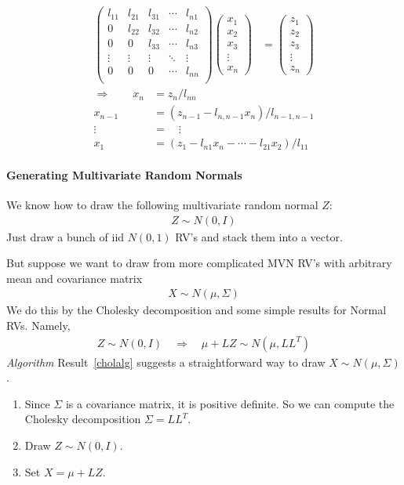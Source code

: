 \documentclass[12pt]{article}
\theoremstyle{plain}
\theoremstyle{definition}
\theoremstyle{remark}
\begin{document}
\begin{align*}
  \begin{pmatrix}
    l_{11} & l_{21}  & l_{31} & \cdots & l_{n1}  \\
    0 & l_{22} &  l_{32} & \cdots & l_{n2}\\
    0 & 0 & l_{33}& \cdots & l_{n3}\\
    \vdots & \vdots & \vdots & \ddots & \vdots\\
    0 & 0 & 0 &\cdots & l_{nn}\\
  \end{pmatrix}
  \begin{pmatrix}
    x_1 \\ x_2 \\ x_3 \\ \vdots \\ x_n
  \end{pmatrix}
  &=
  \begin{pmatrix}
    z_1 \\ z_2 \\ z_3 \\ \vdots \\ z_n
  \end{pmatrix}
\end{align*}
\begin{align*}
  \Rightarrow \qquad
  x_n &= z_n/l_{nn} \\
  x_{n-1} &= (z_{n-1} - l_{n,n-1}x_n)/l_{n-1,n-1} \\
  \vdots \; &= \quad \vdots\\
  x_1 &= (z_1 - l_{n1}x_n - \cdots - l_{21}x_{2})/l_{11}
\end{align*}

\paragraph{Generating Multivariate Random Normals}
We know how to draw the following multivariate random normal $Z$:
\begin{align*}
  Z \sim N(0,I)
\end{align*}
Just draw a bunch of iid $N(0,1)$ RV's and stack them into a vector.

But suppose we want to draw from more complicated MVN RV's with
arbitrary mean and covariance matrix
\begin{align*}
  X \sim N(\mu, \Sigma)
\end{align*}
We do this by the Cholesky decomposition and some simple results for
Normal RVs. Namely,
\begin{align}
  Z \sim N(0,I) \quad \Rightarrow \quad
  \mu+LZ \sim N(\mu, LL^T)
  \label{cholalg}
\end{align}
{\sl Algorithm}\: Result~\ref{cholalg} suggests a straightforward way
to draw $X\sim N(\mu,\Sigma)$.
\begin{enumerate}
  \item Since $\Sigma$ is a covariance matrix, it is positive definite.
    So we can compute the Cholesky decomposition $\Sigma=LL^T$.
  \item Draw $Z\sim N(0,I)$.
  \item Set $X=\mu+LZ$.
\end{enumerate}
\end{document}
